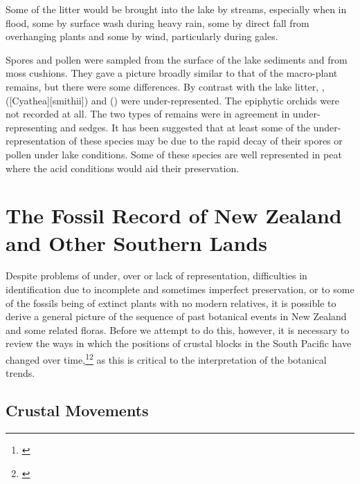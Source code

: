 Some of the litter would be brought into the lake by streams, especially when in flood, some by surface wash during heavy rain, some by direct fall from overhanging plants and some by wind, particularly during gales.

Spores and pollen were sampled from the surface of the lake sediments and from moss cushions.
They gave a picture broadly similar to that of the macro-plant remains, but there were some differences.
By contrast with the lake litter, ,  ([Cyathea][smithii]) and  () were under-represented.
The epiphytic orchids were not recorded at all.
The two types of remains were in agreement in under-representing  and sedges.
It has been suggested that at least some of the under-representation of these species may be due to the rapid decay of their spores or pollen under lake conditions.
Some of these species are well represented in peat where the acid conditions would aid their preservation.

\section{The Fossil Record of New Zealand and Other Southern Lands}
Despite problems of under, over or lack of representation, difficulties in identification due to incomplete and sometimes imperfect preservation, or to some of the fossils being of extinct plants with no modern relatives, it is possible to derive a general picture of the sequence of past botanical events in New Zealand and some related floras.
Before we attempt to do this, however, it is necessary to review the ways in which the positions of crustal blocks in the South Pacific have changed over time,\footnote{\cite{kemp1978tertiary}}\footnote{\cite{crook1981break}} as this is critical to the interpretation of the botanical trends.

\subsection{Crustal Movements}

